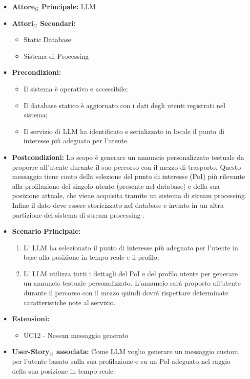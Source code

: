 \documentclass[11pt]{article}
\begin{document}
\begin{justify}
\label{UC11}
\begin{itemize}
    \item \textbf{Attore$_G$ Principale:} LLM
    \item \textbf{Attori$_G$ Secondari:} 
    \begin{itemize}
        \item Static Database
        \item Sistema di Processing
    \end{itemize}
    \item \textbf{Precondizioni:} 
        \begin{itemize}
          \item Il sistema è operativo e accessibile;
          \item Il database statico è aggiornato con i dati degli utenti registrati nel sistema;
            \item Il servizio di LLM ha identificato e serializzato in locale il punto di interesse più adeguato per l'utente.
        \end{itemize}
      \item \textbf{Postcondizioni:} Lo scopo è generare un annuncio personalizzato testuale da proporre all'utente durante il suo percorso con il mezzo di trasporto. Questo messaggio tiene conto della selezione del punto di interesse (PoI) più rilevante alla profilazione del singolo utente (presente nel database) e della sua posizione attuale, che viene acquisita tramite un sistema di stream processing. Infine il dato deve essere storicizzato nel database e inviato in un altra partizione del sistema di stream processing .\\
    \item \textbf{Scenario Principale:} 
        \begin{enumerate}
        \item L' LLM ha selezionato il punto di interesse più adeguato per l'utente in base alla posizione in tempo reale e il profilo;
        \item L' LLM utilizza tutti i dettagli del PoI e del profilo utente per generare un annuncio testuale personalizzato. L'annuncio sarà proposto all'utente durante il percorso con il mezzo quindi dovrà rispettare determinate caratteristiche note al servizio.
        \end{enumerate}
    \item \textbf{Estensioni: } 
    \begin{itemize}
        \item UC12 - Nessun messaggio generato
    \end{itemize}
    \item \textbf{User-Story$_G$ associata:} Come LLM voglio generare un messaggio custom per l'utente basato sulla sua profilazione e su un PoI adeguato nel raggio della sua posizione in tempo reale.
\end{itemize}


\end{justify}
\end{document}
